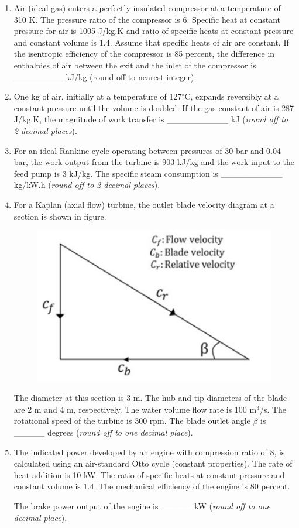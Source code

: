 \documentclass[12pt,onecolumn]{article}
\begin{document}
\begin{enumerate}
    \item Air (ideal gas) enters a perfectly insulated compressor at a temperature of 310 K. The pressure ratio of the compressor is 6. Specific heat at constant pressure for air is 1005 J/kg.K and ratio of specific heats at constant pressure and constant volume is 1.4. Assume that specific heats of air are constant. If the isentropic efficiency of the compressor is 85 percent, the difference in enthalpies of air between the exit and the inlet of the compressor is \_\_\_\_\_\_\_\_ kJ/kg (round off to nearest integer).

    \item One kg of air, initially at a temperature of 127$^\circ$C, expands reversibly at a constant pressure until the volume is doubled. If the gas constant of air is 287 J/kg.K, the magnitude of work transfer is \_\_\_\_\_\_\_\_\_\_ kJ (\textit{round off to 2 decimal places}).

    \item For an ideal Rankine cycle operating between pressures of 30 bar and 0.04 bar, the work output from the turbine is 903 kJ/kg and the work input to the feed pump is 3 kJ/kg. The specific steam consumption is \_\_\_\_\_\_\_\_\_\_ kg/kW.h (\textit{round off to 2 decimal places}).
    \item For a Kaplan (axial flow) turbine, the outlet blade velocity diagram at a section is shown in figure.
          \begin{figure}[H]
              \centering
              \includegraphics[scale=0.5]{q55}
              \label{fig:q55}
          \end{figure}
          The diameter at this section is 3 m. The hub and tip diameters of the blade are 2 m and 4 m, respectively. The water volume flow rate is 100 m$^3$/s. The rotational speed of the turbine is 300 rpm. The blade outlet angle $\beta$ is \_\_\_\_\_ degrees (\textit{round off to one decimal place}).

    \item The indicated power developed by an engine with compression ratio of 8, is calculated using an air-standard Otto cycle (constant properties). The rate of heat addition is 10 kW. The ratio of specific heats at constant pressure and constant volume is 1.4. The mechanical efficiency of the engine is 80 percent.

          The brake power output of the engine is \_\_\_\_\_ kW (\textit{round off to one decimal place}).
\end{enumerate}
\end{document}
